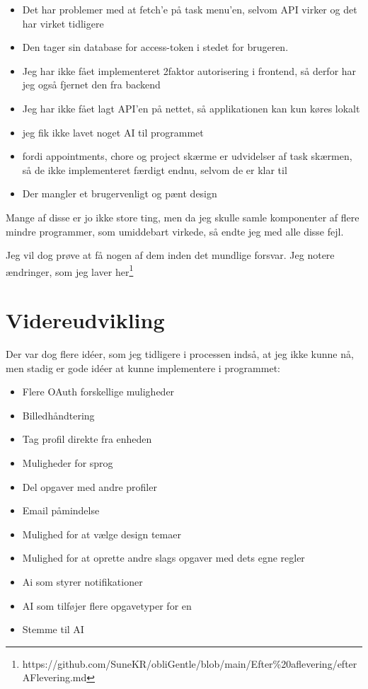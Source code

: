 \documentclass{report}
\begin{document}
\begin{itemize}
\item Det har problemer med at fetch'e på task menu'en, selvom API virker og det har virket tidligere
\item Den tager sin database for access-token i stedet for brugeren.
\item Jeg har ikke fået implementeret 2faktor autorisering i frontend, så derfor har jeg også fjernet den fra backend
\item Jeg har ikke fået lagt API'en på nettet, så applikationen kan kun køres lokalt
\item jeg fik ikke lavet noget AI til programmet
\item fordi appointments, chore og project skærme er udvidelser af task skærmen, så de ikke implementeret færdigt endnu, selvom de er klar til
\item Der mangler et brugervenligt og pænt design
\end{itemize}

Mange af disse er jo ikke store ting, men da jeg skulle samle komponenter af flere mindre programmer, som umiddebart virkede, så endte jeg med alle disse fejl.

Jeg vil dog prøve at få nogen af dem inden det mundlige forsvar. Jeg notere ændringer, som jeg laver her\footnote{https://github.com/SuneKR/obliGentle/blob/main/Efter\%20aflevering/efterAFlevering.md}

\section{Videreudvikling}

Der var dog flere idéer, som jeg tidligere i processen indså, at jeg ikke kunne nå, men stadig er gode idéer at kunne implementere i programmet:

\begin{itemize}
\item Flere OAuth forskellige muligheder
\item Billedhåndtering
\item Tag profil direkte fra enheden
\item Muligheder for sprog
\item Del opgaver med andre profiler
\item Email påmindelse
\item Mulighed for at vælge design temaer
\item Mulighed for at oprette andre slags opgaver med dets egne regler
\item Ai som styrer notifikationer
\item AI som tilføjer flere opgavetyper for en
\item Stemme til AI
\end{itemize}
\end{document}
